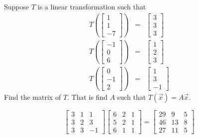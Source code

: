 \documentclass{ximera}
\begin{document}
\begin{problem}\label{prb:10.70} Suppose $T$ is a linear transformation such that
\begin{eqnarray*}
T\left(\left[
\begin{array}{r}
1 \\
1 \\
-7
\end{array}
\right]\right) &=&\left[
\begin{array}{r}
3 \\
3 \\
3
\end{array}
\right] \\
T\left(\left[
\begin{array}{r}
-1 \\
0 \\
6
\end{array}
\right]\right) &=&\left[
\begin{array}{r}
1 \\
2 \\
3
\end{array}
\right] \\
T\left(\left[
\begin{array}{r}
0 \\
-1 \\
2
\end{array}
\right]\right) &=&\left[
\begin{array}{r}
1 \\
3 \\
-1
\end{array}
\right]
\end{eqnarray*}
Find the matrix of $T$. That is find $A$ such that $T(\vec{x})=A\vec{x}$. \vspace{1mm}
\begin{hint}
\[
\left[
\begin{array}{rrr}
3 & 1 & 1 \\
3 & 2 & 3 \\
3 & 3 & -1
\end{array}
\right] \left[
\begin{array}{ccc}
6 & 2 & 1 \\
5 & 2 & 1 \\
6 & 1 & 1
\end{array}
\right] =\left[
\begin{array}{ccc}
29 & 9 & 5 \\
46 & 13 & 8 \\
27 & 11 & 5
\end{array}
\right]
\]
\end{hint}
\end{problem}
\end{document}
